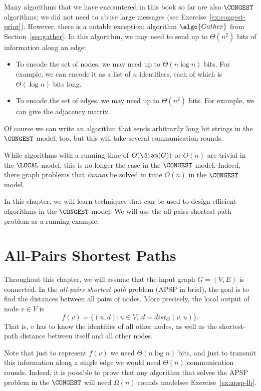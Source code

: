 Many algorithms that we have encountered in this book so far are also $\CONGEST$ algorithms; we did not need to abuse large messages (see Exercise~\ref{ex:congest-prior}). However, there is a notable exception: algorithm $\algo{Gather}$ from Section~\ref{sec:gather}. In this algorithm, we may need to send up to $\Theta(n^2)$ bits of information along an edge:
\begin{itemize}
    \item To encode the set of nodes, we may need up to $\Theta(n \log n)$ bits. For example, we can encode it as a list of $n$ identifiers, each of which is $\Theta(\log n)$ bits long.
    \item To encode the set of edges, we may need up to $\Theta(n^2)$ bits. For example, we can give the adjacency matrix.
\end{itemize}
Of course we can write an algorithm that sends arbitrarily long bit strings in the $\CONGEST$ model, too, but this will take several communication rounds.

While algorithms with a running time of $O(\diam(G))$ or $O(n)$ are trivial in the $\LOCAL$ model, this is no longer the case in the $\CONGEST$ model. Indeed, there graph problems that \emph{cannot} be solved in time $O(n)$ in the $\CONGEST$ model.

In this chapter, we will learn techniques that can be used to design efficient algorithms in the $\CONGEST$ model. We will use the all-pairs shortest path problem as a running example.


\section{All-Pairs Shortest Paths}

Throughout this chapter, we will assume that the input graph $G = (V,E)$ is connected. In the \emph{all-pairs shortest path} problem (APSP in brief), the goal is to find the distances between all pairs of nodes. More precisely, the local output of node $v \in V$ is
\[
    f(v) = \bigl\{ (u, d) : u \in V,\ d = dist_G(v, u) \bigr\}.
\]
That is, $v$ has to know the identities of all other nodes, as well as the shortest-path distance between itself and all other nodes.

Note that just to represent $f(v)$ we need $\Theta(n \log n)$ bits, and just to transmit this information along a single edge we would need $\Theta(n)$ communication rounds. Indeed, it is possible to prove that any algorithm that solves the APSP problem in the $\CONGEST$ will need $\Omega(n)$ rounds model\mydash see Exercise~\ref{ex:apsp-lb}.


